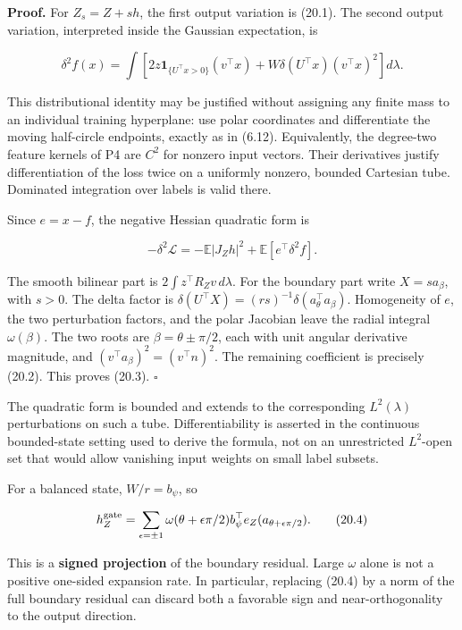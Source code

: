 \documentclass[
  10pt,
]{article}
\begin{document}
\textbf{Proof.} For \(Z_s=Z+sh\), the first output variation is (20.1).
The second output variation, interpreted inside the Gaussian
expectation, is

\[
 \delta^2f(x)=\int\left[
 2z\mathbf1_{\{U^\top x>0\}}(v^\top x)
 +W\delta(U^\top x)(v^\top x)^2\right]d\lambda.
\]

This distributional identity may be justified without assigning any
finite mass to an individual training hyperplane: use polar coordinates
and differentiate the moving half-circle endpoints, exactly as in
(6.12). Equivalently, the degree-two feature kernels of P4 are \(C^2\)
for nonzero input vectors. Their derivatives justify differentiation of
the loss twice on a uniformly nonzero, bounded Cartesian tube. Dominated
integration over labels is valid there.

Since \(e=x-f\), the negative Hessian quadratic form is

\[
 -\delta^2\mathcal L=-\mathbb E|J_Zh|^2+
                          \mathbb E[e^\top\delta^2f].
\]

The smooth bilinear part is \(2\int z^\top R_Zv\,d\lambda\). For the
boundary part write \(X=s a_\beta\), with \(s>0\). The delta factor is
\(\delta(U^\top X)=(rs)^{-1}\delta(a_\theta^\top a_\beta)\). Homogeneity
of \(e\), the two perturbation factors, and the polar Jacobian leave the
radial integral \(\omega(\beta)\). The two roots are
\(\beta=\theta\pm\pi/2\), each with unit angular derivative magnitude,
and \((v^\top a_\beta)^2=(v^\top n)^2\). The remaining coefficient is
precisely (20.2). This proves (20.3). \(\square\)

The quadratic form is bounded and extends to the corresponding
\(L^2(\lambda)\) perturbations on such a tube. Differentiability is
asserted in the continuous bounded-state setting used to derive the
formula, not on an unrestricted \(L^2\)-open set that would allow
vanishing input weights on small label subsets.

For a balanced state, \(W/r=b_\psi\), so

\[
 h_Z^{\rm gate}=
 \sum_{\epsilon=\pm1}\omega(\theta+\epsilon\pi/2)
                    b_\psi^\top e_Z(a_{\theta+\epsilon\pi/2}).
 \tag{20.4}
\]

This is a \textbf{signed projection} of the boundary residual. Large
\(\omega\) alone is not a positive one-sided expansion rate. In
particular, replacing (20.4) by a norm of the full boundary residual can
discard both a favorable sign and near-orthogonality to the output
direction.
\end{document}
